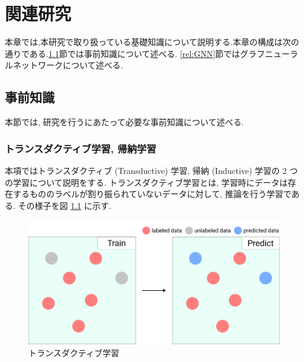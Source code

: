 \documentclass[a4j,twoside,12pt,dvipdfmx]{thesis} %
\begin{document}
\addtocounter{chapter}{+1}

\setlength{\baselineskip}{1.95zw}
\setlength{\textheight}{30\baselineskip}
\mainmatter

\fi
%
\newcommand{\argminnnn}{\mathop{\rm arg~min}\limits}
\renewcommand\thefootnote{\arabic{footnote})}
\def\vector#1{\mbox{\boldmath $#1$}}

\chapter{関連研究}\label{rel}
本章では,本研究で取り扱っている基礎知識について説明する.本章の構成は次の通りである.\ref{rel:preKnowledge}節では事前知識について述べる. \ref{rel:GNN}節ではグラフニューラルネットワークについて述べる.

\section{事前知識}\label{rel:preKnowledge}
本節では, 研究を行うにあたって必要な事前知識について述べる.
\subsection{トランスダクティブ学習, 帰納学習}
本項ではトランスダクティブ (Transductive) 学習, 帰納 (Inductive) 学習の 2 つの学習について説明をする.
トランスダクティブ学習とは, 学習時にデータは存在するもののラベルが割り振られていないデータに対して, 推論を行う学習である. その様子を図 \ref{fig:Transductive} に示す.

\begin{figure}
  \centering
  \includegraphics[width=\linewidth]
  {img/Transductive.jpg}
  \caption{トランスダクティブ学習}
  \label{fig:Transductive}
\end{figure}
\end{document}
